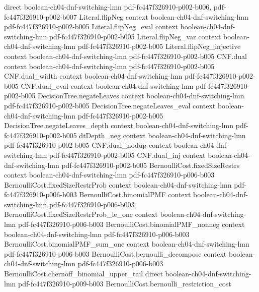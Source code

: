 \begin{theorem}
  {direct}
  {boolean-ch04-dnf-switching-lmn}
  {pdf-fc447f326910-p002-b006,
    pdf-fc447f326910-p002-b007}
\proofstep
  {Literal.flipNeg}
  {context}
  {boolean-ch04-dnf-switching-lmn}
  {pdf-fc447f326910-p002-b005}
\proofstep
  {Literal.flipNeg_eval}
  {context}
  {boolean-ch04-dnf-switching-lmn}
  {pdf-fc447f326910-p002-b005}
\proofstep
  {Literal.flipNeg_var}
  {context}
  {boolean-ch04-dnf-switching-lmn}
  {pdf-fc447f326910-p002-b005}
\proofstep
  {Literal.flipNeg_injective}
  {context}
  {boolean-ch04-dnf-switching-lmn}
  {pdf-fc447f326910-p002-b005}
\proofstep
  {CNF.dual}
  {context}
  {boolean-ch04-dnf-switching-lmn}
  {pdf-fc447f326910-p002-b005}
\proofstep
  {CNF.dual_width}
  {context}
  {boolean-ch04-dnf-switching-lmn}
  {pdf-fc447f326910-p002-b005}
\proofstep
  {CNF.dual_eval}
  {context}
  {boolean-ch04-dnf-switching-lmn}
  {pdf-fc447f326910-p002-b005}
\proofstep
  {DecisionTree.negateLeaves}
  {context}
  {boolean-ch04-dnf-switching-lmn}
  {pdf-fc447f326910-p002-b005}
\proofstep
  {DecisionTree.negateLeaves_eval}
  {context}
  {boolean-ch04-dnf-switching-lmn}
  {pdf-fc447f326910-p002-b005}
\proofstep
  {DecisionTree.negateLeaves_depth}
  {context}
  {boolean-ch04-dnf-switching-lmn}
  {pdf-fc447f326910-p002-b005}
\proofstep
  {dtDepth_neg}
  {context}
  {boolean-ch04-dnf-switching-lmn}
  {pdf-fc447f326910-p002-b005}
\proofstep
  {CNF.dual_nodup}
  {context}
  {boolean-ch04-dnf-switching-lmn}
  {pdf-fc447f326910-p002-b005}
\proofstep
  {CNF.dual_inj}
  {context}
  {boolean-ch04-dnf-switching-lmn}
  {pdf-fc447f326910-p002-b005}
\proofstep
  {BernoulliCost.fixedSizeRestrs}
  {context}
  {boolean-ch04-dnf-switching-lmn}
  {pdf-fc447f326910-p006-b003}
\proofstep
  {BernoulliCost.fixedSizeRestrProb}
  {context}
  {boolean-ch04-dnf-switching-lmn}
  {pdf-fc447f326910-p006-b003}
\proofstep
  {BernoulliCost.binomialPMF}
  {context}
  {boolean-ch04-dnf-switching-lmn}
  {pdf-fc447f326910-p006-b003}
\proofstep
  {BernoulliCost.fixedSizeRestrProb_le_one}
  {context}
  {boolean-ch04-dnf-switching-lmn}
  {pdf-fc447f326910-p006-b003}
\proofstep
  {BernoulliCost.binomialPMF_nonneg}
  {context}
  {boolean-ch04-dnf-switching-lmn}
  {pdf-fc447f326910-p006-b003}
\proofstep
  {BernoulliCost.binomialPMF_sum_one}
  {context}
  {boolean-ch04-dnf-switching-lmn}
  {pdf-fc447f326910-p006-b003}
\proofstep
  {BernoulliCost.bernoulli_decompose}
  {context}
  {boolean-ch04-dnf-switching-lmn}
  {pdf-fc447f326910-p006-b003}
\proofstep
  {BernoulliCost.chernoff_binomial_upper_tail}
  {direct}
  {boolean-ch04-dnf-switching-lmn}
  {pdf-fc447f326910-p009-b003}
\proofstep
  {BernoulliCost.bernoulli_restriction_cost}

\end{theorem}

